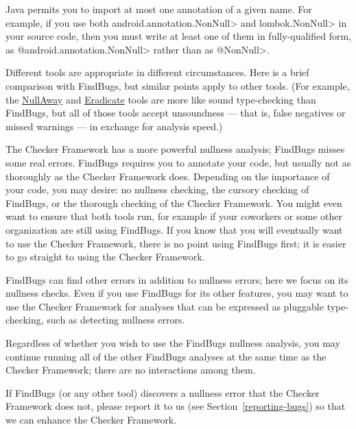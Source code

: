 Java permits you to import at most one annotation of a given name.  For
example, if you use both \<android.annotation.NonNull> and
\<lombok.NonNull> in your source code, then you must write at least one of
them in fully-qualified form, as \<@android.annotation.NonNull> rather than
as \<@NonNull>.



Different tools are appropriate in different circumstances.  Here is a
brief comparison with FindBugs, but similar points apply to other tools.
(For example, the \href{https://github.com/uber/NullAway}{NullAway} and
\href{https://fbinfer.com/docs/eradicate/}{Eradicate} tools are more
like sound type-checking than FindBugs, but all of those tools accept
unsoundness --- that is, false negatives or missed warnings --- in exchange
for analysis speed.)

The Checker Framework has a more powerful nullness analysis; FindBugs misses
some real
errors.  FindBugs requires you to annotate your code, but usually not as
thoroughly as the Checker Framework does.  Depending on the importance of
your code, you may desire:  no nullness checking, the cursory checking of
FindBugs, or the thorough checking of the Checker Framework.  You might
even want to ensure that both tools run, for example if your coworkers or
some other organization are still using FindBugs.  If you know that you
will eventually want to use the Checker Framework, there is no point using
FindBugs first; it is easier to go straight to using the Checker Framework.

FindBugs can find other errors in addition to nullness errors; here
we focus on its nullness checks.  Even if you use FindBugs for its other
features, you may want to use the Checker Framework for analyses that can
be expressed as pluggable type-checking, such as detecting nullness errors.

Regardless of whether you wish to use the FindBugs nullness analysis, you
may continue running all of the other FindBugs analyses at the same time as
the Checker Framework; there are no interactions among them.

If FindBugs (or any other tool) discovers a nullness error that the Checker
Framework does not, please report it to us (see
Section~\ref{reporting-bugs}) so that we can enhance the Checker Framework.




